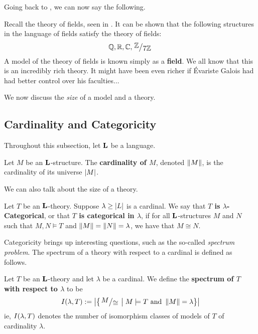 Going back to , we can now say the following.

\begin{boxexample}
    Recall the theory of fields, seen in . It can be shown that the following structures in the language of fields satisfy the theory of fields:
    \begin{align*}
        \Q, \R, \C, \quotient{\Z}{7\Z}
    \end{align*}
    A model of the theory of fields is known simply as a \textbf{field}. We all know that this is an incredibly rich theory. It might have been even richer if Évariste Galois had had better control over his faculties...
\end{boxexample}

We now discuss the \textit{size} of a model and a theory.

\subsection{Cardinality and Categoricity}

Throughout this subsection, let $\mathbf{L}$ be a language.

\begin{boxdefinition}
    Let $M$ be an $\mathbf{L}$-structure. The \textbf{cardinality of $M$}, denoted $\left\lVert M \right\rVert$, is the cardinality of its universe $\left\lvert M \right\rvert$.
\end{boxdefinition}

We can also talk about the size of a theory.

\begin{boxdefinition}\label{Ch1:Def:Categoricity}
    Let $T$ be an $\mathbf{L}$-theory. Suppose $\lambda \geq \left\lvert L \right\rvert$ is a cardinal. We say that \textbf{$T$ is $\lambda$-Categorical}, or that \textbf{$T$ is categorical in $\lambda$}, if for all $\mathbf{L}$-structures $M$ and $N$ such that $M, N \models T$ and $\left\lVert M \right\rVert = \left\lVert N \right\rVert = \lambda$, we have that $M \cong N$.
\end{boxdefinition}

Categoricity brings up interesting questions, such as the so-called \textit{spectrum problem}. The spectrum of a theory with respect to a cardinal is defined as follows.

\begin{boxdefinition}[Spectrum]
    Let $T$ be an $\mathbf{L}$-theory and let $\lambda$ be a cardinal. We define the \textbf{spectrum of $T$ with respect to $\lambda$} to be
    \begin{align*}
        I\of{\lambda, T} := \abs{
            \setst{\quotient{M}{\cong}}{M \models T \text{ and } \norm{M} = \lambda}
        }
    \end{align*}
    ie, $I\!\left( \lambda, T \right)$ denotes the number of isomorphism classes of models of $T$ of cardinality $\lambda$.
\end{boxdefinition}

